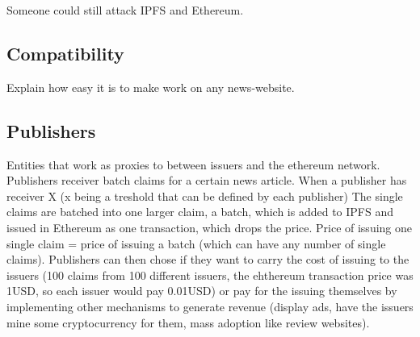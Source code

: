 Someone could still attack IPFS and Ethereum.

\subsection{Compatibility}
Explain how easy it is to make work on any news-website.



\subsection{Publishers}
Entities that work as proxies to between issuers and the ethereum network.
Publishers receiver batch claims for a certain news article. When a publisher has receiver X (x being a treshold that can be defined by each publisher)
The single claims are batched into one larger claim, a batch, which is added to IPFS and issued in Ethereum as one transaction, which drops the price. Price of issuing one single claim = price of issuing a batch (which can have any number of single claims).
Publishers can then chose if they want to carry the cost of issuing to the issuers (100 claims from 100 different issuers, the ehthereum transaction price was 1USD, so each issuer would pay 0.01USD) or pay for the issuing themselves by implementing other mechanisms to generate revenue (display ads, have the issuers mine some cryptocurrency for them, mass adoption like review websites).
